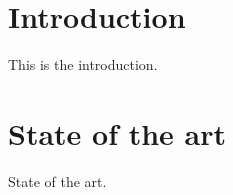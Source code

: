 \chapter{Introduction}%
\label{cha:introduction}

This is the introduction.

\chapter{State of the art}%
\label{cha:state_of_the_art}

State of the art.
